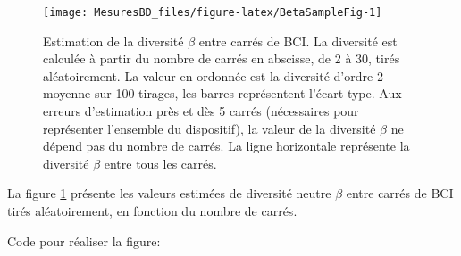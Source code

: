 \documentclass[
  11pt,
  french,
  a4paper,
  extrafontsizes,onecolumn,openright
  ]{memoir}
\begin{document}
\scriptsize

\begin{figure}

{\centering \texttt{[image: MesuresBD\_files/figure-latex/BetaSampleFig-1]} 

}

\caption{Estimation de la diversité \(\beta\) entre carrés de BCI. La diversité est calculée à partir du nombre de carrés en abscisse, de 2 à 30, tirés aléatoirement. La valeur en ordonnée est la diversité d'ordre 2 moyenne sur 100 tirages, les barres représentent l'écart-type. Aux erreurs d'estimation près et dès 5 carrés (nécessaires pour représenter l'ensemble du dispositif), la valeur de la diversité \(\beta\) ne dépend pas du nombre de carrés. La ligne horizontale représente la diversité \(\beta\) entre tous les carrés.}\label{fig:BetaSampleFig}
\end{figure}

\normalsize

La figure \ref{fig:BetaSampleFig} présente les valeurs estimées de diversité neutre \(\beta\) entre carrés de BCI tirés aléatoirement, en fonction du nombre de carrés.

Code pour réaliser la figure:

\scriptsize
\end{document}
